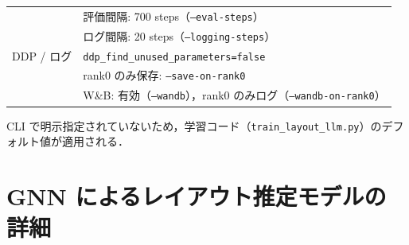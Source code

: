 \documentclass[a4j,12pt,dvipdfmx]{jsreport}
\begin{document}
\begin{table}[htbp]
\begin{threeparttable}
\begin{tabular}{ll}
                  &
      評価間隔: 700 steps（\texttt{--eval-steps}）                                                             \\
                  &
      ログ間隔: 20 steps（\texttt{--logging-steps}）                                                           \\
      \midrule
      DDP / ログ    &
      \texttt{ddp\_find\_unused\_parameters=false}                                                       \\
                  &
      rank0 のみ保存: \texttt{--save-on-rank0}                                                               \\
                  &
      W\&B: 有効（\texttt{--wandb}），rank0 のみログ（\texttt{--wandb-on-rank0}）                                   \\
      \bottomrule
    \end{tabular}
    \begin{tablenotes}[flushleft]
      \footnotesize
      \item[a] CLI で明示指定されていないため，学習コード（\texttt{train\_layout\_llm.py}）のデフォルト値が適用される．
    \end{tablenotes}
  \end{threeparttable}
\end{table}

\newpage

\section{GNN によるレイアウト推定モデルの詳細}
\label{app:script2name_gnn}
\end{document}
